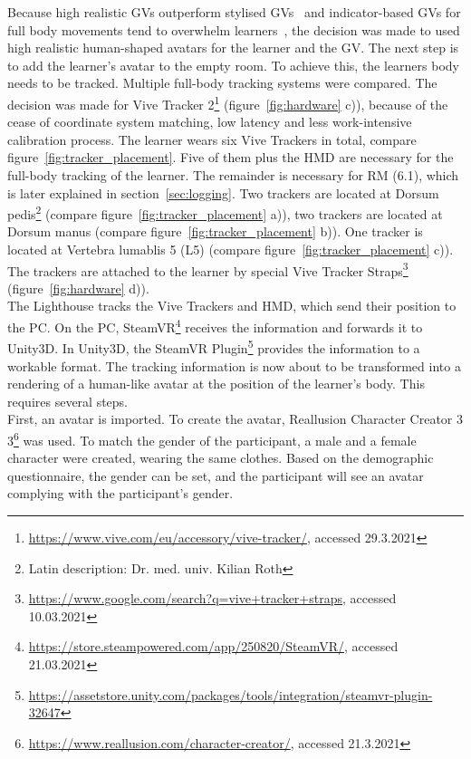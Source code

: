 Because high realistic GVs outperform stylised GVs~\cite{max} and indicator-based GVs for full body movements tend to overwhelm learners~\cite{lightguide}, the decision was made to used high realistic human-shaped avatars for the learner and the GV. The next step is to add the learner's avatar to the empty room. To achieve this, the learners body needs to be tracked. Multiple full-body tracking systems were compared. The decision was made for Vive Tracker 2\footnote{\href{https://www.vive.com/eu/accessory/vive-tracker/}{https://www.vive.com/eu/accessory/vive-tracker/}, accessed 29.3.2021} (figure~\ref{fig:hardware} c)), because of the cease of coordinate system matching, low latency and less work-intensive calibration process. The learner wears six Vive Trackers in total, compare figure~\ref{fig:tracker_placement}. Five of them plus the HMD are necessary for the full-body tracking of the learner. The remainder is necessary for RM (6.1), which is later explained in section~\ref{sec:logging}. Two trackers are located at Dorsum pedis\footnote{\label{fn:latin}Latin description: Dr. med. univ. Kilian Roth} (compare figure~\ref{fig:tracker_placement} a)), two trackers are located at Dorsum manus (compare figure~\ref{fig:tracker_placement} b)). One  tracker is located at Vertebra lumablis 5 (L5) (compare figure~\ref{fig:tracker_placement} c)). The trackers are attached to the learner by special Vive Tracker Straps\footnote{\href{https://www.google.com/search?q=vive+tracker+straps}{https://www.google.com/search?q=vive+tracker+straps}, accessed 10.03.2021} (figure~\ref{fig:hardware} d)).\\
The Lighthouse tracks the Vive Trackers and HMD, which send their position to the PC. On the PC, SteamVR\footnote{\href{https://store.steampowered.com/app/250820/SteamVR/}{https://store.steampowered.com/app/250820/SteamVR/}, accessed 21.03.2021} receives the information and forwards it to Unity3D. In Unity3D, the SteamVR Plugin\footnote{\href{https://assetstore.unity.com/packages/tools/integration/steamvr-plugin-32647}{https://assetstore.unity.com/packages/tools/integration/steamvr-plugin-32647}} provides the information to a workable format. The tracking information is now about to be transformed into a rendering of a human-like avatar at the position of the learner's body. This requires several steps.\\First, an avatar is imported. To create the avatar, Reallusion Character Creator 3 3\footnote{\href{https://www.reallusion.com/character-creator/}{https://www.reallusion.com/character-creator/}, accessed 21.3.2021} was used. To match the gender of the participant, a male and a female character were created, wearing the same clothes. Based on the demographic questionnaire, the gender can be set, and the participant will see an avatar complying with the participant's gender.\\
